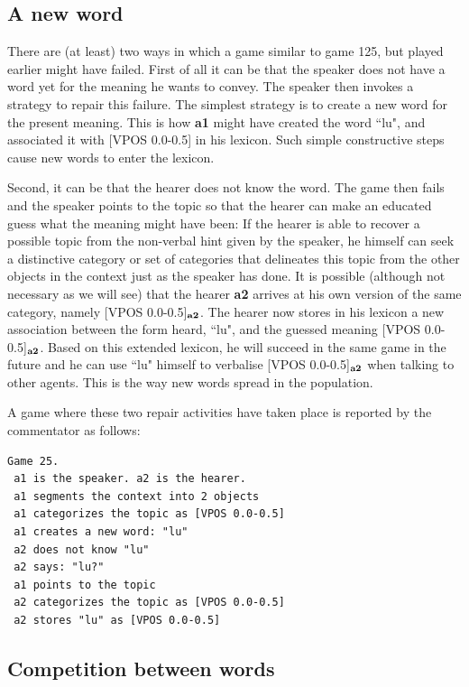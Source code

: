 \subsection{A new word}

There are (at least) two ways in which a game similar to game 125, 
but played earlier might have failed. First of all it can be that
the speaker does not have a word yet for the meaning he wants
to convey. The speaker then invokes a strategy 
to repair this failure. The simplest strategy is to 
create a new word for the present meaning. This is how 
{\bf a1} might have created the word ``lu", and associated it 
with [VPOS 0.0-0.5] in his lexicon. Such simple constructive steps cause
new words to enter the lexicon. 

Second, it can be that the hearer does not know the word. The 
game then fails and the speaker points to 
the topic so that the hearer can make 
an educated guess what the meaning might have been:
If the hearer is able to recover a possible topic
from the non-verbal hint given by the speaker, 
he himself can seek a distinctive category or set of categories 
that delineates this topic from the other objects in 
the context just as the speaker has done. It is 
possible (although not necessary as we will see)
that the hearer {\bf a2} arrives at his 
own version of the same category, namely [VPOS 0.0-0.5]$_{\bf a2}$. The 
hearer now stores in his lexicon a new association between the 
form heard, ``lu", and the guessed meaning [VPOS 0.0-0.5]$_{\bf a2}$. 
Based on this extended lexicon, he will succeed in the same game 
in the future and he can use ``lu" himself to verbalise [VPOS 0.0-0.5]$_{\bf a2}$
when talking to other agents. This is the way new words
spread in the population.

A game where these two repair activities have taken
place is reported by the commentator as follows: 
\begin{verbatim}
Game 25.
 a1 is the speaker. a2 is the hearer. 
 a1 segments the context into 2 objects
 a1 categorizes the topic as [VPOS 0.0-0.5]
 a1 creates a new word: "lu"
 a2 does not know "lu"
 a2 says: "lu?"
 a1 points to the topic 
 a2 categorizes the topic as [VPOS 0.0-0.5]
 a2 stores "lu" as [VPOS 0.0-0.5]
\end{verbatim}

\subsection{Competition between words}

